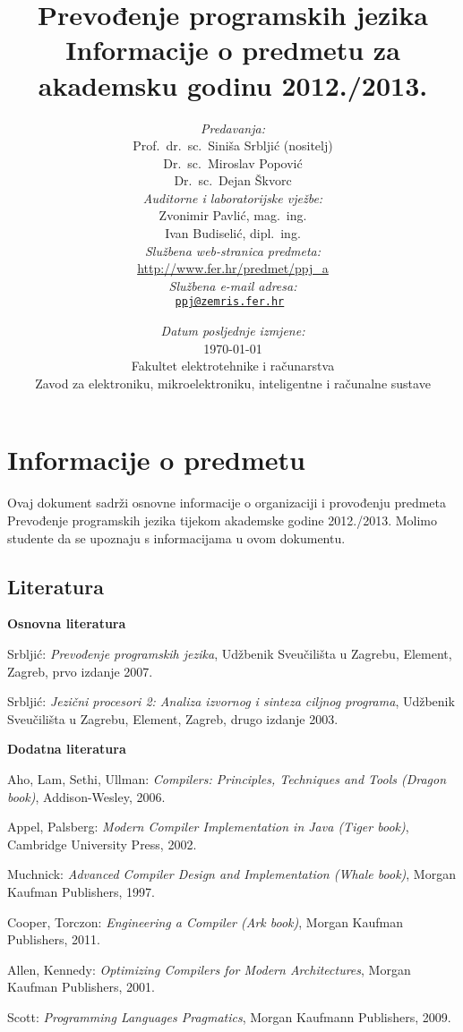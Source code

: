 \documentclass[times, 12pt, utf8]{book}
\title{
\vfill
\textbf{Prevođenje programskih jezika}\\
\vspace{30pt}
Informacije o predmetu za akademsku godinu 2012./2013. \\
\vspace{40pt}
}
\author{
\emph{Predavanja:} \\
Prof.~dr.~sc.~Siniša Srbljić (nositelj) \\
Dr.~sc.~Miroslav Popović \\
\vspace{30pt}
Dr.~sc.~Dejan Škvorc \\
\emph{Auditorne i laboratorijske vježbe:} \\
Zvonimir Pavlić, mag.~ing. \\
\vspace{30pt}
Ivan Budiselić, dipl.~ing. \\
\emph{Službena web-stranica predmeta:} \\
\vspace{30pt}
\url{http://www.fer.hr/predmet/ppj_a} \\
\emph{Službena e-mail adresa:} \\
\tt{\href{mailto:ppj@zemris.fer.hr}{ppj@zemris.fer.hr}}
}
\date{
\vspace{30pt} 
\emph{Datum posljednje izmjene:} \\
\today \\
\vfill
Fakultet elektrotehnike i računarstva \\
Zavod za elektroniku, mikroelektroniku, inteligentne i računalne sustave
}
\begin{document}
\maketitle

\section*{Informacije o predmetu}

Ovaj dokument sadrži osnovne informacije o organizaciji i provođenju predmeta Prevođenje programskih jezika tijekom akademske godine 2012./2013. 
Molimo studente da se upoznaju s informacijama u ovom dokumentu.

\let\cleardoublepage\relax
{}

\tableofcontents

\cleardoublepage  
{}  
{}  
\subsection*{Literatura}

\textbf{Osnovna literatura}

Srbljić: \textit{Prevođenje programskih jezika}, Udžbenik Sveučilišta u Zagrebu, Element, Zagreb, prvo izdanje 2007.

Srbljić: \textit{Jezični procesori 2: Analiza izvornog i sinteza ciljnog programa}, Udžbenik Sveučilišta u Zagrebu, Element, Zagreb, drugo izdanje 2003.

\textbf{Dodatna literatura}

Aho, Lam, Sethi, Ullman: \textit{Compilers: Principles, Techniques and Tools (Dragon book)}, Addison-Wesley, 2006. 

Appel, Palsberg: \textit{Modern Compiler Implementation in Java (Tiger book)}, Cambridge University Press, 2002.

Muchnick: \textit{Advanced Compiler Design and Implementation (Whale book)}, Morgan Kaufman Publishers, 1997.

Cooper, Torczon: \textit{Engineering a Compiler (Ark book)}, Morgan Kaufman Publishers, 2011.

Allen, Kennedy: \textit{Optimizing Compilers for Modern Architectures}, Morgan Kaufman Publishers, 2001.

Scott: \textit{Programming Languages Pragmatics}, Morgan Kaufmann Publishers, 2009.

\cleardoublepage  
{}
{}
\end{document}
